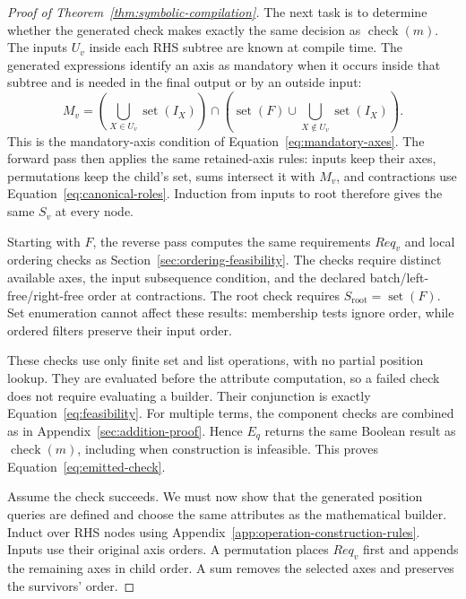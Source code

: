 \begin{proof}[Proof of Theorem~\ref{thm:symbolic-compilation}]
The next task is to determine whether the generated check makes exactly
the same decision as $\operatorname{check}(m)$. The inputs $U_v$ inside each
RHS subtree are known at compile time. The generated expressions identify
an axis as mandatory when it occurs inside that subtree and is needed in the final
output or by an outside input:
\begin{equation}
 M_v=\left(\bigcup_{X\in U_v}\operatorname{set}(I_X)\right)
 \cap\left(\operatorname{set}(F)\cup
             \bigcup_{X\notin U_v}\operatorname{set}(I_X)\right).
 \label{eq:emitted-mandatory}
\end{equation}
This is the mandatory-axis condition of Equation~\eqref{eq:mandatory-axes}.
The forward pass then applies the same retained-axis rules: inputs keep
their axes, permutations keep the child's set, sums intersect it with
$M_v$, and contractions use Equation~\eqref{eq:canonical-roles}. Induction
from inputs to root therefore gives the same $S_v$ at every node.

Starting with $F$, the reverse pass computes the same requirements $Req_v$
and local ordering checks as Section~\ref{sec:ordering-feasibility}.
The checks require distinct available axes, the input subsequence condition,
and the declared batch/left-free/right-free order at contractions.
The root check requires $S_{\mathrm{root}}=\operatorname{set}(F)$.
Set enumeration cannot affect these results: membership tests ignore order,
while ordered filters preserve their input order.

These checks use only finite set and list operations, with no partial
position lookup. They are evaluated before the attribute computation, so
a failed check does not require evaluating a builder. Their conjunction
is exactly Equation~\eqref{eq:feasibility}. For multiple terms, the component
checks are combined as in Appendix~\ref{sec:addition-proof}. Hence $E_q$
returns the same Boolean result as $\operatorname{check}(m)$, including
when construction is infeasible. This proves Equation~\eqref{eq:emitted-check}.

Assume the check succeeds. We must now show that the generated position
queries are defined and choose the same attributes as the mathematical
builder. Induct over RHS nodes using Appendix~\ref{app:operation-construction-rules}.
Inputs use their original axis orders. A permutation places $Req_v$ first
and appends the remaining axes in child order. A sum removes the selected
axes and preserves the survivors' order.


\end{proof}
